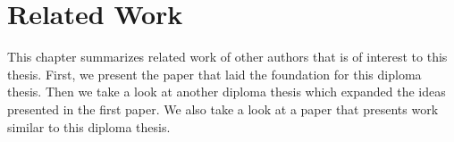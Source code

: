 \chapter{Related Work}
\label{related}

This chapter summarizes related work of other authors that is of interest to this thesis.
First, we present the paper that laid the foundation for this diploma thesis.
Then we take a look at another diploma thesis which expanded the ideas presented in the first paper.
We also take a look at a paper that presents work similar to this diploma thesis.




